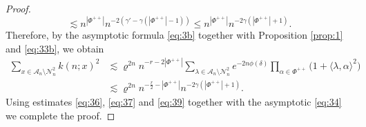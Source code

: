 \documentclass[10pt,a4paper]{amsart}
\newcommand{\calA}{\mathcal{A}}
\newcommand{\calN}{\mathcal{N}}
\newcommand{\scrA}{\mathscr{A}}
\newcommand{\scrN}{\mathscr{N}}
\newcommand{\sprod}[2]{\langle {#1}, {#2} \rangle}
\begin{document}
\begin{proof}
\[		\lesssim 
		n^{|\Phi^{++}|} n^{-2(\gamma' - \gamma (|\Phi^{++}| - 1))}
		\leqslant
		n^{|\Phi^{++}|} n^{-2\gamma (|\Phi^{++}| + 1)}.
	\]
	Therefore, by the asymptotic formula \eqref{eq:3b} together with Proposition \ref{prop:1} and \eqref{eq:33b}, we obtain
	\begin{align}
		\nonumber
		\sum_{x \in \scrA_n \setminus \scrN_n^2}
		k(n; x)^2
		&\lesssim
		\varrho^{2n} n^{-r - 2 |\Phi^{++}|} 
		\sum_{\lambda \in \calA_n \setminus \calN_n^2}
		e^{-2n \phi(\delta)}
		\prod_{\alpha \in \Phi^{++}} \big(1 + \sprod{\lambda}{\alpha}^2\big) \\
		\label{eq:39}
		&\lesssim
		\varrho^{2n} n^{-\frac{r}2 - |\Phi^{++}|}  n^{-2\gamma (|\Phi^{++}| + 1)}.
	\end{align}
	Using estimates \eqref{eq:36}, \eqref{eq:37} and \eqref{eq:39} together with the asymptotic \eqref{eq:34} 
	we complete the proof.
\end{proof}
\end{document}
